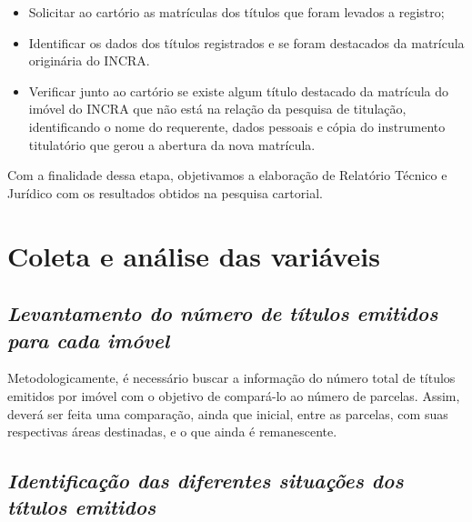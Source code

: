 \documentclass[
  letterpaper,
]{report}
\providecommand{\tightlist}{%
  \setlength{\itemsep}{0pt}\setlength{\parskip}{0pt}}\usepackage{longtable,booktabs,array}
\begin{document}
\begin{itemize}
\tightlist
\item
  Solicitar ao cartório as matrículas dos títulos que foram levados a
  registro;
\item
  Identificar os dados dos títulos registrados e se foram destacados da
  matrícula originária do INCRA.
\item
  Verificar junto ao cartório se existe algum título destacado da
  matrícula do imóvel do INCRA que não está na relação da pesquisa de
  titulação, identificando o nome do requerente, dados pessoais e cópia
  do instrumento titulatório que gerou a abertura da nova matrícula.
\end{itemize}

Com a finalidade dessa etapa, objetivamos a elaboração de Relatório
Técnico e Jurídico com os resultados obtidos na pesquisa cartorial.

\hypertarget{coleta-e-anuxe1lise-das-variuxe1veis}{%
\section{Coleta e análise das
variáveis}\label{coleta-e-anuxe1lise-das-variuxe1veis}}

\hypertarget{levantamento-do-nuxfamero-de-tuxedtulos-emitidos-para-cada-imuxf3vel}{%
\subsection{\texorpdfstring{\emph{Levantamento do número de títulos
emitidos para cada
imóvel}}{Levantamento do número de títulos emitidos para cada imóvel}}\label{levantamento-do-nuxfamero-de-tuxedtulos-emitidos-para-cada-imuxf3vel}}

Metodologicamente, é necessário buscar a informação do número total de
títulos emitidos por imóvel com o objetivo de compará-lo ao número de
parcelas. Assim, deverá ser feita uma comparação, ainda que inicial,
entre as parcelas, com suas respectivas áreas destinadas, e o que ainda
é remanescente.

\hypertarget{identificauxe7uxe3o-das-diferentes-situauxe7uxf5es-dos-tuxedtulos-emitidos}{%
\subsection{\texorpdfstring{\emph{Identificação das diferentes situações
dos títulos
emitidos}}{Identificação das diferentes situações dos títulos emitidos}}\label{identificauxe7uxe3o-das-diferentes-situauxe7uxf5es-dos-tuxedtulos-emitidos}}
\end{document}

